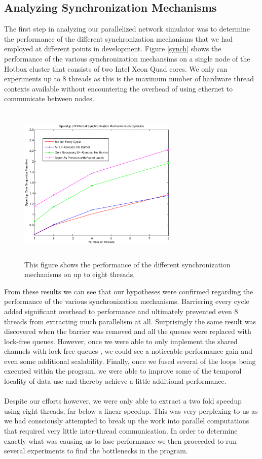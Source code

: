 \documentclass[twocolumn]{article}
\begin{document}
\subsection{Analyzing Synchronization Mechanisms}
The first step in analyzing our parallelized network simulator was to
determine the performance of the different synchronization mechanisms that
we had employed at different points in development.  Figure \ref{synch}
shows the performance of the various synchronization mechansims on a
single node of the Hotbox cluster that consists of two Intel Xeon Quad
cores.  We only ran experiments up to 8 threads as this is the maximum
number of hardware thread contexts available without encountering the
overhead of using ethernet to communicate between nodes.\\
\begin{figure}[h]
\centering
\includegraphics[width=3in,height=3in]{synch.eps}
\caption{\label{org} This figure shows the performance of the different
synchronization mechanisms on up to eight threads.}
\end{figure}
From these results we can see that our hypotheses were confirmed regarding
the performance of the various synchronization mechanisms.  Barriering
every cycle added significant overhead to performance and ultimately
prevented even 8 threads from extracting much parallelism at all.
Surprisingly the same result was discovered when the barrier was removed and
all the queues were replaced with lock-free queues.  However, once we were
able to only implement the shared channels with lock-free queues , we could see a noticeable performance gain and even some
additional scalability.  Finally, once we fused several of the loops being
executed within the program, we were able to improve some of the temporal
locality of data use and thereby achieve a little additional
performance.\\
~\\
Despite our efforts however, we were only able to extract a two fold
speedup using eight threads, far below a linear speedup.  This was very
perplexing to us as we had consciously attempted to break up the work into
parallel computations that required very little inter-thread
communication.  In order to determine exactly what was causing us to lose
performance we then proceeded to run several experiments to find the
bottlenecks in the program.
\end{document}
